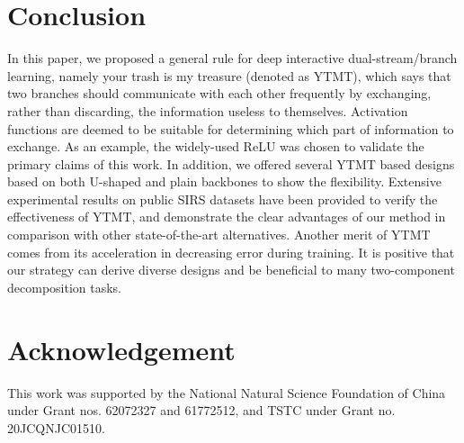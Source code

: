 \documentclass{article}
\begin{document}
\section{Conclusion} 
In this paper, we proposed a general rule for deep interactive dual-stream/branch learning, namely your trash is my treasure (denoted as YTMT), which says that two branches should communicate with each other frequently by exchanging, rather than discarding, the information useless to themselves. Activation functions are deemed to be suitable for determining which part of information to exchange. As an example, the widely-used ReLU was chosen to validate the primary claims of this work. In addition, we offered several YTMT based designs based on both U-shaped and plain backbones to show the flexibility. Extensive experimental results on public SIRS datasets have been provided to verify the effectiveness of YTMT, and demonstrate the clear advantages of our method in comparison with other state-of-the-art alternatives. Another merit of YTMT comes from its acceleration in decreasing error during training. It is positive that our strategy can derive diverse designs and be beneficial to many two-component decomposition tasks.

\section*{Acknowledgement}
This work was supported by the National Natural Science Foundation of China under Grant nos. 62072327 and 61772512, and TSTC  under Grant no. 20JCQNJC01510.



\end{document}
